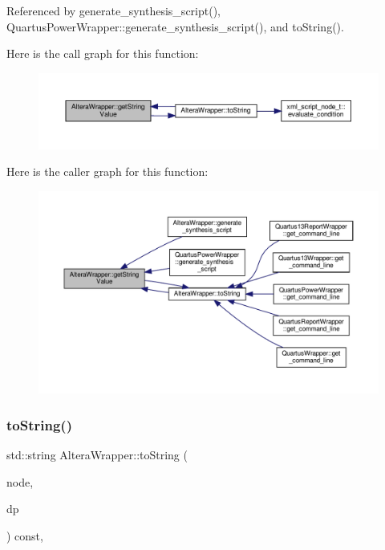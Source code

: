 Referenced by generate\+\_\+synthesis\+\_\+script(), Quartus\+Power\+Wrapper\+::generate\+\_\+synthesis\+\_\+script(), and to\+String().

Here is the call graph for this function\+:
\nopagebreak
\begin{figure}[H]
\begin{center}
\leavevmode
\includegraphics[width=350pt]{d3/d5f/classAlteraWrapper_a3a0bb0f3531b35bf4e9b615042b00e97_cgraph}
\end{center}
\end{figure}
Here is the caller graph for this function\+:
\nopagebreak
\begin{figure}[H]
\begin{center}
\leavevmode
\includegraphics[width=350pt]{d3/d5f/classAlteraWrapper_a3a0bb0f3531b35bf4e9b615042b00e97_icgraph}
\end{center}
\end{figure}
\mbox{\label{classAlteraWrapper_a0e6e4558b643ccd1ba0179c4e5d470d8}} 
\subsubsection{\texorpdfstring{to\+String()}{toString()}}
{\footnotesize\ttfamily std\+::string Altera\+Wrapper\+::to\+String (\begin{DoxyParamCaption}\item[{const \hyperlink{xml__script__command_8hpp_a1fe3d50ade66bc35e41be9b68bbbcd02}{xml\+\_\+script\+\_\+node\+\_\+t\+Ref}}]{node,  }\item[{const \hyperlink{DesignParameters_8hpp_ae36bb1c4c9150d0eeecfe1f96f42d157}{Design\+Parameters\+Ref}}]{dp }\end{DoxyParamCaption}) const\hspace{0.3cm}{\ttfamily [override]}, {\ttfamily [virtual]}}



